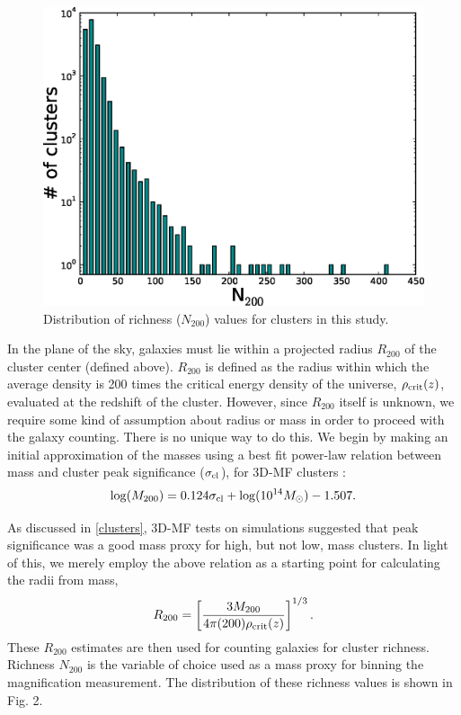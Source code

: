 \begin{figure}
\begin{center}
\includegraphics[scale=0.6]{plots_ch3/N200histogram.eps}
\caption[\ac{3D-MF} Cluster Richness Distribution]{Distribution of richness ($N_{200}$) values for clusters in this study.}
\label{hist}
\end{center}
\end{figure}

In the plane of the sky, galaxies must lie within a projected radius $R_{200}$ of the cluster center (defined above). $R_{200}$ is defined as the radius within which the average density is 200 times the critical energy density of the universe, $\rho_{\rm crit}(z)$, evaluated at the redshift of the cluster. However, since $R_{200}$ itself is unknown, we require some kind of assumption about radius or mass in order to proceed with the galaxy counting. There is no unique way to do this. We begin by making an initial approximation of the masses using a best fit power-law relation between mass and cluster peak significance ($\sigma_{\rm cl}$), for \ac{3D-MF} clusters \citep{MMthesis11}:
\begin{equation}
\mathrm{log}(M_{200}) = 0.124 \sigma_{\rm cl} + \mathrm{log}(10^{14} M_{\odot}) - 1.507.
\end{equation}

As discussed in \ref{clusters}, \ac{3D-MF} tests on simulations suggested that peak significance was a good mass proxy for high, but not low, mass clusters. In light of this, we merely employ the above relation as a starting point for calculating the radii from mass,
\begin{equation}
R_{200} = \left[ \frac{3 M_{200}}{4 \pi (200) \rho_{\rm crit}(z)} \right] ^ {1/3}.
\end{equation}
These $R_{200}$ estimates are then used for counting galaxies for cluster richness. Richness $N_{200}$ is the variable of choice used as a mass proxy for binning the magnification measurement. The distribution of these richness values is shown in Fig. 2.

